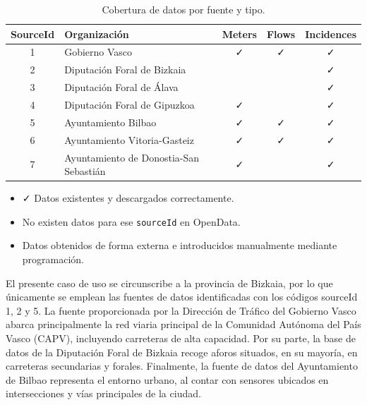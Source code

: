 \begin{table}[H]
	\centering
	\small
	\caption{Cobertura de datos por fuente y tipo.}
	\label{tab:cobertura_datos_opendata}
	\begin{tabularx}{\textwidth}{cXccc}
		\toprule
		\textbf{SourceId} & \textbf{Organización} & \textbf{Meters} & \textbf{Flows} & \textbf{Incidences} \\
		\midrule
		1 & Gobierno Vasco & \textcolor{mygreen}{\faCheck} & \textcolor{mygreen}{\faCheck} & \textcolor{mygreen}{\faCheck} \\
		2 & Diputación Foral de Bizkaia & \textcolor{gray}{\faHandPaper} & \textcolor{gray}{\faHandPaper} & \textcolor{mygreen}{\faCheck} \\
		3 & Diputación Foral de Álava & \textcolor{myred}{\faTimes} & \textcolor{myred}{\faTimes} & \textcolor{mygreen}{\faCheck} \\
		4 & Diputación Foral de Gipuzkoa & \textcolor{mygreen}{\faCheck} & \textcolor{myred}{\faTimes} & \textcolor{mygreen}{\faCheck} \\
		5 & Ayuntamiento Bilbao & \textcolor{mygreen}{\faCheck} & \textcolor{mygreen}{\faCheck} & \textcolor{mygreen}{\faCheck} \\
		6 & Ayuntamiento Vitoria-Gasteiz & \textcolor{mygreen}{\faCheck} & \textcolor{mygreen}{\faCheck} & \textcolor{mygreen}{\faCheck} \\
		7 & Ayuntamiento de Donostia-San Sebastián & \textcolor{mygreen}{\faCheck} & \textcolor{myred}{\faTimes} & \textcolor{mygreen}{\faCheck} \\
		\bottomrule
	\end{tabularx}
\end{table}

\begin{itemize}
	\item \textcolor{mygreen}{\faCheck} Datos existentes y descargados correctamente.
	\item \textcolor{myred}{\faTimes} No existen datos para ese \texttt{sourceId} en OpenData.
	\item \textcolor{gray}{\faHandPaper} Datos obtenidos de forma externa e introducidos manualmente mediante programación.
\end{itemize}

El presente caso de uso se circunscribe a la provincia de Bizkaia, por lo que únicamente se emplean las fuentes de datos identificadas con los códigos sourceId 1, 2 y 5. La fuente proporcionada por la Dirección de Tráfico del Gobierno Vasco abarca principalmente la red viaria principal de la Comunidad Autónoma del País Vasco (CAPV), incluyendo carreteras de alta capacidad. Por su parte, la base de datos de la Diputación Foral de Bizkaia recoge aforos situados, en su mayoría, en carreteras secundarias y forales. Finalmente, la fuente de datos del Ayuntamiento de Bilbao representa el entorno urbano, al contar con sensores ubicados en intersecciones y vías principales de la ciudad.

